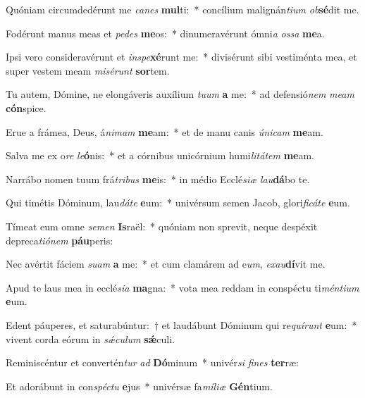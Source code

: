 \item Quóniam circumdedérunt me \textit{ca}\textit{nes} \textbf{mul}ti:~* concílium malignán\textit{ti}\textit{um} \textit{ob}\textbf{sé}dit me.
\item Fodérunt manus meas et \textit{pe}\textit{des} \textbf{me}os:~* dinumeravérunt ómni\textit{a} \textit{os}\textit{sa} \textbf{me}a.
\item Ipsi vero consideravérunt et \textit{in}\textit{spe}\textbf{xé}runt me:~* divisérunt sibi vestiménta mea, et super vestem meam \textit{mi}\textit{sé}\textit{runt} \textbf{sor}tem.
\item Tu autem, Dómine, ne elongáveris auxílium \textit{tu}\textit{um} \textbf{a} me:~* ad defensió\textit{nem} \textit{me}\textit{am} \textbf{cón}spice.
\item Erue a frámea, Deus, á\textit{ni}\textit{mam} \textbf{me}am:~* et de manu canis \textit{ú}\textit{ni}\textit{cam} \textbf{me}am.
\item Salva me ex o\textit{re} \textit{le}\textbf{ó}nis:~* et a córnibus unicórnium humi\textit{li}\textit{tá}\textit{tem} \textbf{me}am.
\item Narrábo nomen tuum frá\textit{tri}\textit{bus} \textbf{me}is:~* in médio Ecclé\textit{si}\textit{æ} \textit{lau}\textbf{dá}bo te.
\item Qui timétis Dóminum, lau\textit{dá}\textit{te} \textbf{e}um:~* univérsum semen Jacob, glori\textit{fi}\textit{cá}\textit{te} \textbf{e}um.
\item Tímeat eum omne \textit{se}\textit{men} \textbf{Is}raël:~* quóniam non sprevit, neque despéxit depreca\textit{ti}\textit{ó}\textit{nem} \textbf{páu}peris:
\item Nec avértit fáciem \textit{su}\textit{am} \textbf{a} me:~* et cum clamárem ad e\textit{um}, \textit{ex}\textit{au}\textbf{dí}vit me.
\item Apud te laus mea in ecclé\textit{si}\textit{a} \textbf{ma}gna:~* vota mea reddam in conspéctu ti\textit{mén}\textit{ti}\textit{um} \textbf{e}um.
\item Edent páuperes, et saturabúntur:~† et laudábunt Dóminum qui re\textit{quí}\textit{runt} \textbf{e}um:~* vivent corda eórum in \textit{sǽ}\textit{cu}\textit{lum} \textbf{sǽ}culi.
\item Reminiscéntur et convertén\textit{tur} \textit{ad} \textbf{Dó}minum~* univér\textit{si} \textit{fi}\textit{nes} \textbf{ter}ræ:
\item Et adorábunt in con\textit{spéc}\textit{tu} \textbf{e}jus~* univérsæ fa\textit{mí}\textit{li}\textit{æ} \textbf{Gén}tium.
